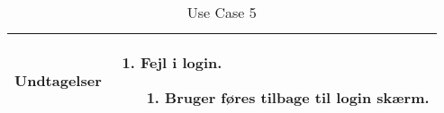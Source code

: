 \begin{table}[H]
\begin{tabular}{| p{3cm}| p{11.5cm}|}
Undtagelser							& 

									\renewcommand{\labelenumi}{\Roman{enumi}:}
									\renewcommand{\labelenumii}{\alph{enumii})}
									\begin{enumerate}[topsep=0.0cm,leftmargin=0.5cm]
										\item Fejl i login.
											\begin{enumerate}[topsep=0cm, leftmargin=1cm]
												\item Bruger føres tilbage til login skærm.
											\end{enumerate}
									\end{enumerate} \\\hline	

\end{tabular}
\caption{Use Case 5}
\label{tab:UC5}
\end{table}
